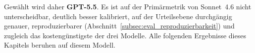 Gewählt wird daher \textbf{GPT-5.5}. Es ist auf der Primärmetrik von Sonnet~4.6 nicht
unterscheidbar, deutlich besser kalibriert, auf der Urteilsebene durchgängig genauer,
reproduzierbarer (Abschnitt~\ref{subsec:eval_reproduzierbarkeit}) und zugleich das kostengünstigste der drei Modelle.
Alle folgenden Ergebnisse dieses Kapitels beruhen auf diesem Modell.

%
%
%
%
